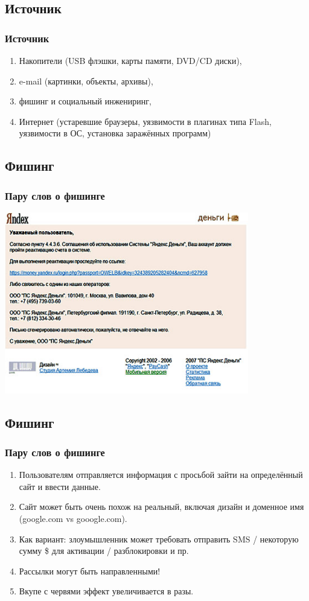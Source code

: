 \documentclass[compress,red]{beamer}
\begin{document}
\subsection{Источник}
\begin{frame}
  \frametitle{Источник}
  
  \begin{enumerate}[<+->]
	  \item Накопители (USB флэшки, карты памяти, DVD/CD диски),
	  \item e-mail (картинки, объекты, архивы),
	  \item фишинг и социальный инжениринг,
	  \item Интернет (устаревшие браузеры, уязвимости в плагинах типа Flash, уязвимости в ОС, установка заражённых программ)
	\end{enumerate}
  
\end{frame}

\subsection{Фишинг}
\begin{frame}
  \frametitle{Пару слов о фишинге}
  \centerline{\includegraphics[width=0.8\textwidth]{images/fishing.jpg}}
\end{frame}

\subsection{Фишинг}
\begin{frame}
  \frametitle{Пару слов о фишинге}
  
  \begin{enumerate}[<+->]
	  \item Пользователям отправляется информация с просьбой зайти на определённый сайт и ввести данные.
	  \item Сайт может быть очень похож на реальный, включая дизайн и доменное имя (google.com vs gooogle.com).
	  \item Как вариант: злоумышленник может требовать отправить SMS / некоторую сумму \$ для активации / разблокировки и пр.
	  \item Рассылки могут быть направленными!
	  \item Вкупе с червями эффект увеличивается в разы.
	\end{enumerate}
  
\end{frame}
\end{document}
